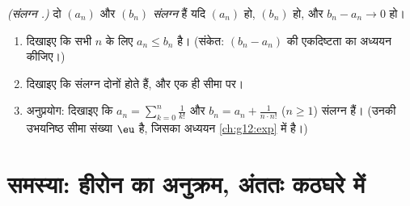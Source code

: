 \begin{exercise}[$\star\star\star$]\label{exo:g12:seq:10}
\emph{(संलग्न .)} दो  $(a_n)$ और $(b_n)$ \emph{संलग्न} हैं यदि
$(a_n)$  हो, $(b_n)$  हो, और $b_n - a_n \to 0$ हो।
\begin{enumerate}
  \item दिखाइए कि सभी $n$ के लिए $a_n \leq b_n$ है। (संकेत: $(b_n - a_n)$ की एकदिष्टता का
        अध्ययन कीजिए।)
  \item दिखाइए कि संलग्न  दोनों  होते हैं, और एक ही सीमा पर।
  \item अनुप्रयोग: दिखाइए कि  $a_n = \sum_{k=0}^{n} \frac{1}{k!}$ और $b_n = a_n + \frac{1}{n \cdot n!}$ ($n \geq 1$) संलग्न हैं।
        (उनकी उभयनिष्ठ सीमा संख्या $\eu$ है, जिसका अध्ययन \cref{ch:g12:exp} में है।)
\end{enumerate}
\end{exercise}

\section{समस्या: हीरोन का अनुक्रम, अंततः कठघरे में}

